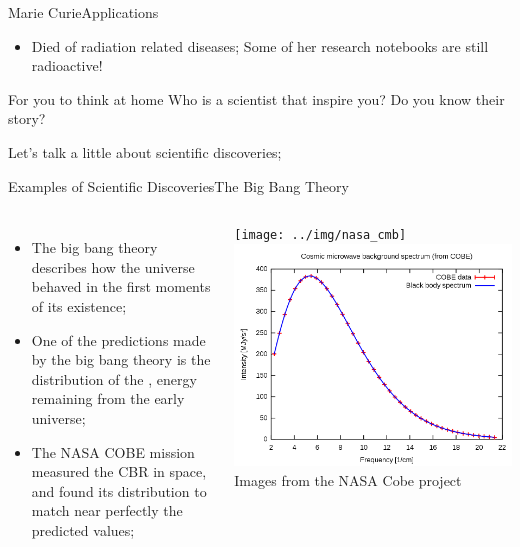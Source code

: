 \documentclass{beamer}
\begin{document}
\begin{CJK}{UTF8}{ipxm}
\begin{frame}{Marie Curie}{Applications}
\begin{itemize}
    \item Died of radiation related diseases; Some of her research notebooks are still radioactive!
  \end{itemize}
\end{frame}

\begin{frame}{For you to think at home}{}
  Who is a scientist that inspire you? Do you know their story?
  \vfill

  Let's talk a little about scientific discoveries;
\end{frame}

\begin{frame}{Examples of Scientific Discoveries}{The Big Bang Theory}

  \begin{columns}

    \begin{itemize}
      \item The big bang theory describes how the universe behaved in the first moments of its existence;
      \medskip

      \item One of the predictions made by the big bang theory is the distribution of the , energy remaining from the early universe;
      \medskip

      \item The NASA COBE mission measured the CBR in space, and found its distribution to match near perfectly the predicted values;
    \end{itemize}

    \texttt{[image: ../img/nasa\_cmb]}
    \includegraphics[width=1\textwidth]{../img/nasa_cmb_data}\\
    Images from the NASA Cobe project


\end{columns}
\end{frame}
\end{CJK}
\end{document}
